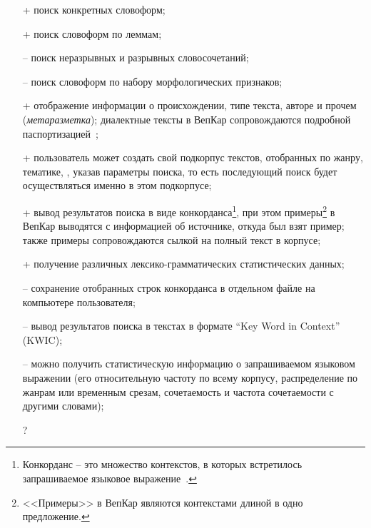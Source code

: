 \begin{itemize}
    \item[+] поиск конкретных словоформ;
    \item[+] поиск словоформ по леммам;
    \item[--] поиск неразрывных и разрывных словосочетаний;
    \item[--] поиск словоформ по набору морфологических признаков;
    \item[+] отображение информации о происхождении, типе текста, авторе и прочем (\emph{метаразметка}); 
        диалектные тексты в ВепКар сопровождаются подробной паспортизацией~\cite{Krizhanovsky2019Architecture};
    \item[+] пользователь может создать свой подкорпус текстов, 
        отобранных по жанру, тематике, , 
        указав параметры поиска, 
        то есть последующий поиск будет осуществляться именно в этом подкорпусе;
    
    \item[+] вывод результатов поиска в виде конкорданса\footnote{
            Конкорданс -- это множество контекстов, 
            в которых встретилось запрашиваемое языковое выражение~\cite[с.~415]{Kibrik2019}.
        }, при этом примеры\footnote{<<Примеры>> 
                                        в ВепКар являются контекстами 
                                        длиной в одно предложение.} 
                в ВепКар выводятся с информацией об источнике, откуда был взят пример; 
                также примеры сопровождаются сылкой на полный текст в корпусе;
    \item[+] получение различных лексико-грамматических статистических данных;
    \item[--] сохранение отобранных строк конкорданса в отдельном файле на компьютере пользователя;
    \item[--] вывод результатов поиска в текстах в формате ``Key Word in Context'' (KWIC);
    \item[--] можно получить статистическую информацию 
        о запрашиваемом языковом выражении (его относительную частоту по всему корпусу,
        распределение по жанрам или временным срезам, сочетаемость и частота сочетаемости с другими словами);
        
    \item[?] 
\end{itemize}
